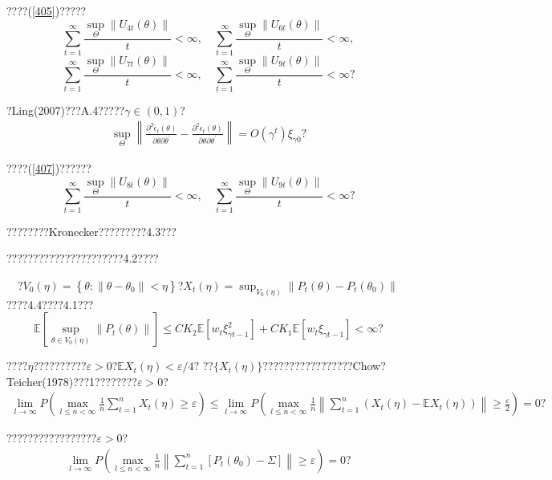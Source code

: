 \documentclass[a4paper,12pt,openany,oneside,utf-8]{ctexbook}
\newcommand{\xiaosihao}{\fontsize{12pt}{\baselineskip}\selectfont}
\begin{document}
	\noindent ????(\ref{405})?????
	$$
	\sum_{t=1}^{\infty} \frac{\sup _{\Theta}\left\|U_{4 t}(\theta)\right\|}{t}<\infty,\quad
	\sum_{t=1}^{\infty} \frac{\sup _{\Theta}\left\|U_{6 t}(\theta)\right\|}{t}<\infty,
	$$
	$$
	\sum_{t=1}^{\infty} \frac{\sup _{\Theta}\left\|U_{7 t}(\theta)\right\|}{t}<\infty, \quad
	\sum_{t=1}^{\infty} \frac{\sup _{\Theta}\left\|U_{9 t}(\theta)\right\|}{t}<\infty \mbox{?}
	$$
	
	\noindent ?Ling(2007)???A.4?????$\gamma\in(0,1)$?
	\begin{align}
		\sup _{\Theta}\left\|\frac{\partial^{2} \tilde{\epsilon}_{t}(\theta)}{\partial \theta \partial \theta^{\prime}}-\frac{\partial^{2} \epsilon_{t}(\theta)}{\partial \theta \partial \theta^{\prime}}\right\|=O\left(\gamma^{t}\right) \xi_{\gamma 0} \mbox{?}\nonumber
	\end{align}
	
	\noindent ????(\ref{407})??????
	$$
	\sum_{t=1}^{\infty} \frac{\sup _{\Theta}\left\|U_{8 t}(\theta)\right\|}{t}<\infty,\quad
	\sum_{t=1}^{\infty} \frac{\sup _{\Theta}\left\|U_{9 t}(\theta)\right\|}{t}<\infty \mbox{?}
	$$
	
	\noindent ????????Kronecker?????????4.3???
	
	??????????????????????4.2????
	
	\noindent{\xiaosihao\heiti ??~4.3}~~?$V_{0}(\eta)=\left\{\theta :\left\|\theta-\theta_{0}\right\|<\eta\right\}$?$X_{t}(\eta)=\sup _{V_{0}(\eta)}\left\|P_{t}(\theta)-P_{t}\left(\theta_{0}\right)\right\|$????4.4????4.1???
	$$\mathbb{E} \left[\sup_{\theta \in V_{0}(\eta)}\left\|P_{t}(\theta)\right\|\right]\le CK_2\mathbb{E}\left[w_t\xi^2_{\gamma t-1}\right]+CK_1\mathbb{E}\left[w_t\xi_{\gamma t-1}\right]<\infty\mbox{?}$$
	
	\noindent ????$\eta$??????????$\varepsilon>0$?$\mathbb{E} X_{t}(\eta)<\varepsilon / 4$? ??$\{X_t(\eta)\}$?????????????????Chow?Teicher(1978)???1????????$\varepsilon>0$?
	\begin{align}\label{408}
		\lim _{l \rightarrow \infty} P\left(\max _{l\leq n<\infty} \frac{1}{n} \sum_{t=1}^{n} X_{t}(\eta) \geq \varepsilon\right) \leq \lim _{l \rightarrow \infty} P\left(\max _{l \leq n<\infty} \frac{1}{n}\left\|\sum_{t=1}^{n}\left(X_{t}(\eta)-\mathbb{E} X_{t}(\eta)\right)\right\| \geq \frac{\varepsilon}{2}\right)=0\mbox{?}
	\end{align}
	
	\noindent ?????????????????$\varepsilon>0$?
	\begin{align}\label{409}
		\lim _{l \rightarrow \infty} P\left(\max _{l \leq n<\infty} \frac{1}{n}\left\|\sum_{t=1}^{n}\left[P_{t}\left(\theta_{0}\right)-\Sigma\right]\right\| \geq \varepsilon\right)=0\mbox{?}
	\end{align}
	
\end{document}
